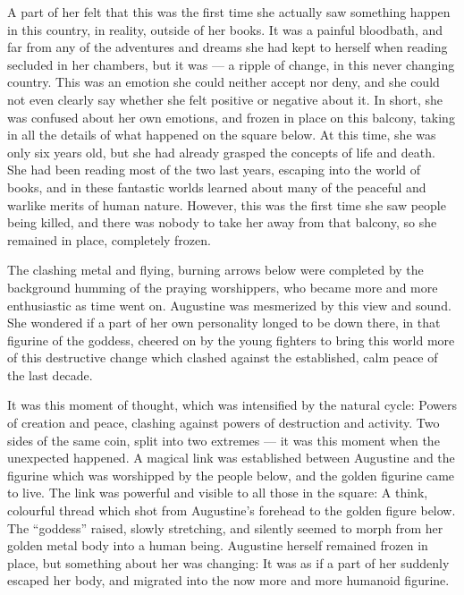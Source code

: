 A part of her felt that this was the first time she actually saw something happen in this country, in reality, outside of her books. It was a painful bloodbath, and far from any of the adventures and dreams she had kept to herself when reading secluded in her chambers, but it was --- a ripple of change, in this never changing country. This was an emotion she could neither accept nor deny, and she could not even clearly say whether she felt positive or negative about it. In short, she was confused about her own emotions, and frozen in place on this balcony, taking in all the details of what happened on the square below. At this time, she was only six years old, but she had already grasped the concepts of life and death. She had been reading most of the two last years, escaping into the world of books, and in these fantastic worlds learned about many of the peaceful and warlike merits of human nature. However, this was the first time she saw people being killed, and there was nobody to take her away from that balcony, so she remained in place, completely frozen.

The clashing metal and flying, burning arrows below were completed by the background humming of the praying worshippers, who became more and more enthusiastic as time went on. Augustine was mesmerized by this view and sound. She wondered if a part of her own personality longed to be down there, in that figurine of the goddess, cheered on by the young fighters to bring this world more of this destructive change which clashed against the established, calm peace of the last decade.

It was this moment of thought, which was intensified by the natural cycle: Powers of creation and peace, clashing against powers of destruction and activity. Two sides of the same coin, split into two extremes --- it was this moment when the unexpected happened. A magical link was established between Augustine and the figurine which was worshipped by the people below, and the golden figurine came to live. The link was powerful and visible to all those in the square: A think, colourful thread which shot from Augustine's forehead to the golden figure below. The \enquote{goddess} raised, slowly stretching, and silently seemed to morph from her golden metal body into a human being. Augustine herself remained frozen in place, but something about her was changing: It was as if a part of her suddenly escaped her body, and migrated into the now more and more humanoid figurine.


